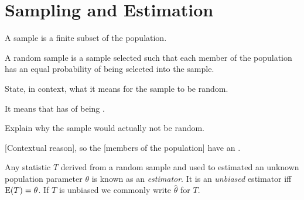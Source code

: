 \documentclass[../Notes.tex]{subfiles}
\begin{document}
\chapter{Sampling and Estimation}
\begin{definition}{}{}
  A sample is a finite subset of the population.
\end{definition}
\begin{definition}{}{}
  A random sample is a sample selected such that each member of the population has an equal probability of being selected into the sample.
\end{definition}
\begin{note}
  State, in context, what it means for the sample to be random.
  \begin{center}
    \parbox{0.9\textwidth}{
      It means that  has  of being . 
    }
  \end{center}
\end{note}
\begin{note}
  Explain why the sample would actually not be random.
  \begin{center}
    \parbox{0.9\textwidth}{
      [Contextual reason], so  the [members of the population] have an . 
    }
  \end{center}
\end{note}
\begin{definition}{}{}
  Any statistic \(T\) derived from a random sample and used to estimated an unknown population parameter \(\theta\) is known as an \emph{estimator}. It is an \emph{unbiased} estimator iff \(\operatorname{E}(T)=\theta\). If \(T\) is unbiased we commonly write \(\hat{\theta}\) for \(T\).
\end{definition}
\end{document}
